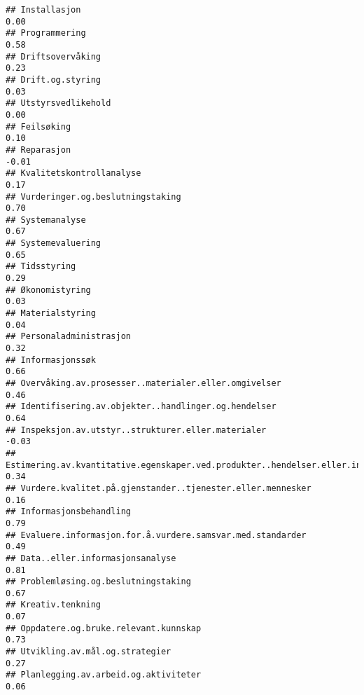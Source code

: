\documentclass[
]{article}
\begin{document}
\begin{verbatim}
## Installasjon                                                                      0.00
## Programmering                                                                     0.58
## Driftsovervåking                                                                  0.23
## Drift.og.styring                                                                  0.03
## Utstyrsvedlikehold                                                                0.00
## Feilsøking                                                                        0.10
## Reparasjon                                                                       -0.01
## Kvalitetskontrollanalyse                                                          0.17
## Vurderinger.og.beslutningstaking                                                  0.70
## Systemanalyse                                                                     0.67
## Systemevaluering                                                                  0.65
## Tidsstyring                                                                       0.29
## Økonomistyring                                                                    0.03
## Materialstyring                                                                   0.04
## Personaladministrasjon                                                            0.32
## Informasjonssøk                                                                   0.66
## Overvåking.av.prosesser..materialer.eller.omgivelser                              0.46
## Identifisering.av.objekter..handlinger.og.hendelser                               0.64
## Inspeksjon.av.utstyr..strukturer.eller.materialer                                -0.03
## Estimering.av.kvantitative.egenskaper.ved.produkter..hendelser.eller.informasjon  0.34
## Vurdere.kvalitet.på.gjenstander..tjenester.eller.mennesker                        0.16
## Informasjonsbehandling                                                            0.79
## Evaluere.informasjon.for.å.vurdere.samsvar.med.standarder                         0.49
## Data..eller.informasjonsanalyse                                                   0.81
## Problemløsing.og.beslutningstaking                                                0.67
## Kreativ.tenkning                                                                  0.07
## Oppdatere.og.bruke.relevant.kunnskap                                              0.73
## Utvikling.av.mål.og.strategier                                                    0.27
## Planlegging.av.arbeid.og.aktiviteter                                              0.06

\end{verbatim}
\end{document}
